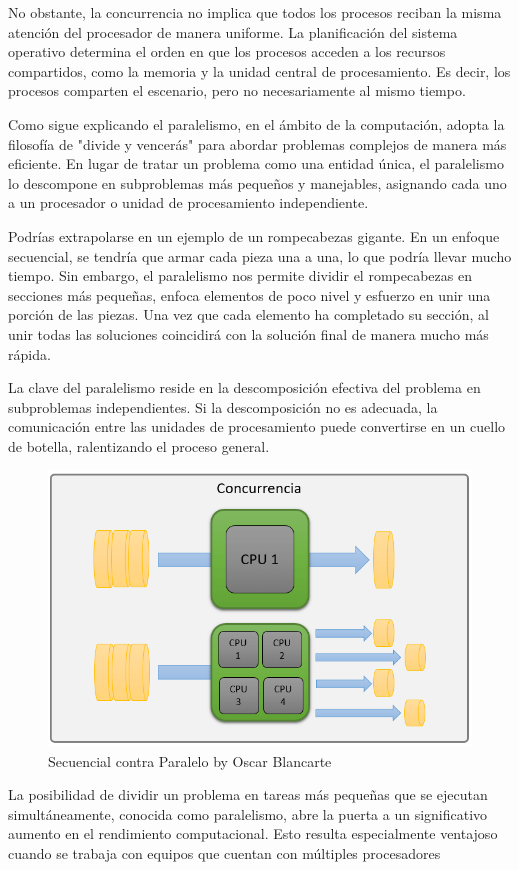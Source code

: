 No obstante, la concurrencia no implica que todos los procesos reciban la misma atención del procesador de manera uniforme. La planificación del sistema operativo determina el orden en que los procesos acceden a los recursos compartidos, como la memoria y la unidad central de procesamiento. Es decir, los procesos comparten el escenario, pero no necesariamente al mismo tiempo.

Como sigue explicando \cite{oscar} el paralelismo, en el ámbito de la computación, adopta la filosofía de "divide y vencerás" para abordar problemas complejos de manera más eficiente. En lugar de tratar un problema como una entidad única, el paralelismo lo descompone en subproblemas más pequeños y manejables, asignando cada uno a un procesador o unidad de procesamiento independiente.

Podrías extrapolarse en un ejemplo de un rompecabezas gigante. En un enfoque secuencial, se tendría que armar cada pieza una a una, lo que podría llevar mucho tiempo. Sin embargo, el paralelismo nos permite dividir el rompecabezas en secciones más pequeñas, enfoca elementos de poco nivel y esfuerzo en unir una porción de las piezas. Una vez que cada elemento ha completado su sección, al unir todas las soluciones coincidirá con la solución final de manera mucho más rápida.

La clave del paralelismo reside en la descomposición efectiva del problema en subproblemas independientes. Si la descomposición no es adecuada, la comunicación entre las unidades de procesamiento puede convertirse en un cuello de botella, ralentizando el proceso general.

\begin{figure}[h]
	\centering \includegraphics[width=0.65\linewidth]{img/Concurrencia_1.png}
	\caption{Secuencial contra Paralelo by Oscar Blancarte}
	\label{fig:etiqueta1}
\end{figure}

 La posibilidad de dividir un problema en tareas más pequeñas que se ejecutan simultáneamente, conocida como paralelismo, abre la puerta a un significativo aumento en el rendimiento computacional. Esto resulta especialmente ventajoso cuando se trabaja con equipos que cuentan con múltiples procesadores \cite{Stallings}

